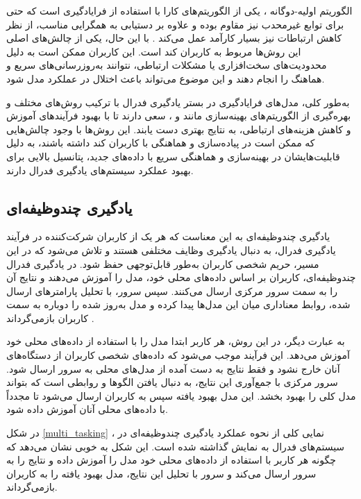 الگوریتم اولیه-دوگانه%
%
، یکی از الگوریتم‌های کارا با استفاده از فرایادگیری است که حتی برای توابع غیرمحدب نیز مقاوم بوده و علاوه بر دستیابی به همگرایی مناسب، از نظر کاهش ارتباطات نیز بسیار کارآمد عمل می‌کند
\cite{zhang2021fedpd}.
با این حال، یکی از چالش‌های اصلی این روش‌ها مربوط به کاربران کند است. این کاربران ممکن است به دلیل محدودیت‌های سخت‌افزاری یا مشکلات ارتباطی، نتوانند به‌روزرسانی‌های سریع و هماهنگ را انجام دهند و این موضوع می‌تواند باعث اختلال در عملکرد مدل شود.

به‌طور کلی، مدل‌های فرایادگیری در بستر یادگیری فدرال با ترکیب روش‌های مختلف و بهره‌گیری از الگوریتم‌های بهینه‌سازی مانند
و
%
، سعی دارند تا با بهبود فرآیندهای آموزش و کاهش هزینه‌های ارتباطی، به نتایج بهتری دست یابند. این روش‌ها با وجود چالش‌هایی که ممکن است در پیاده‌سازی و هماهنگی با کاربران کند داشته باشند، به دلیل قابلیت‌هایشان در بهینه‌سازی و هماهنگی سریع با داده‌های جدید، پتانسیل بالایی برای بهبود عملکرد سیستم‌های یادگیری فدرال دارند.

\subsection{یادگیری چندوظیفه‌ای}
یادگیری چندوظیفه‌ای به این معناست که هر یک از کاربران شرکت‌کننده در فرآیند یادگیری فدرال، به دنبال یادگیری وظایف مختلفی هستند و تلاش می‌شود که در این مسیر، حریم شخصی کاربران به‌طور قابل‌توجهی حفظ شود. در یادگیری فدرال چندوظیفه‌ای، کاربران بر اساس داده‌های محلی خود، مدل را آموزش می‌دهند و نتایج آن را به سمت سرور مرکزی ارسال می‌کنند. سپس سرور، با تحلیل پارامترهای ارسال شده، روابط معناداری میان این مدل‌ها پیدا کرده و مدل به‌روز شده را دوباره به سمت کاربران بازمی‌گرداند
\cite{corinzia2019variational}.

به عبارت دیگر، در این روش، هر کاربر ابتدا مدل را با استفاده از داده‌های محلی خود آموزش می‌دهد. این فرآیند موجب می‌شود که داده‌های شخصی کاربران از دستگاه‌های آنان خارج نشود و فقط نتایج به دست آمده از مدل‌های محلی به سرور ارسال شود. سرور مرکزی با جمع‌آوری این نتایج، به دنبال یافتن الگوها و روابطی است که بتواند مدل کلی را بهبود بخشد. این مدل بهبود یافته سپس به کاربران ارسال می‌شود تا مجدداً با داده‌های محلی آنان آموزش داده شود.

در شکل
\ref{multi_tasking}%
، نمایی کلی از نحوه عملکرد یادگیری چندوظیفه‌ای در سیستم‌های فدرال به نمایش گذاشته شده است. این شکل به خوبی نشان می‌دهد که چگونه هر کاربر با استفاده از داده‌های محلی خود مدل را آموزش داده و نتایج را به سرور ارسال می‌کند و سرور با تحلیل این نتایج، مدل بهبود یافته را به کاربران بازمی‌گرداند.


